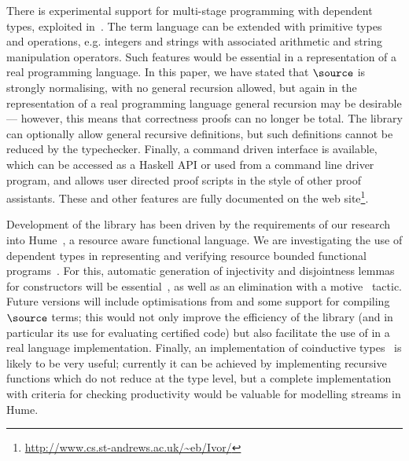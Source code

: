 There is experimental support for multi-stage programming with
dependent types, exploited in~\cite{dtpmsp-gpce}.  The term language
can be extended with primitive types and operations, e.g. integers and
strings with associated arithmetic and string manipulation
operators. Such features would be essential in a representation of a
real programming language. In this paper, we have stated that
$\source$ is strongly normalising, with no general recursion allowed,
but again in the representation of a real programming language general
recursion may be desirable --- however, this means that correctness
proofs can no longer be total. The library can optionally allow
general recursive definitions, but such definitions cannot be reduced
by the typechecker. Finally, a command driven interface is available,
which can be accessed as a Haskell API or used from a command line
driver program, and allows user directed proof scripts in the style of
other proof assistants. These and other features are fully documented
on the web
site\footnote{\url{http://www.cs.st-andrews.ac.uk/~eb/Ivor/}}.


Development of the library has been driven by the requirements of
our research into Hume~\cite{Hume-GPCE}, a resource aware functional
language. We are investigating the use of dependent types in
representing and verifying resource bounded functional
programs~\cite{dt-framework}. For this, automatic generation of
injectivity and disjointness lemmas for constructors will be
essential~\cite{concon}, as well as an elimination with a
motive~\cite{elim-motive} tactic. Future versions will include
optimisations from \cite{brady-thesis} and some support for compiling
$\source$ terms; this would not only improve the efficiency of the
library (and in particular its use for evaluating certified code)
but also facilitate the use of \Ivor{} in a real language
implementation. Finally, an implementation of coinductive
types~\cite{coinductive} is likely to be very useful; currently it can
be achieved by implementing recursive functions which do not reduce at
the type level, but a complete implementation with criteria for
checking productivity would be valuable for modelling streams in Hume.
